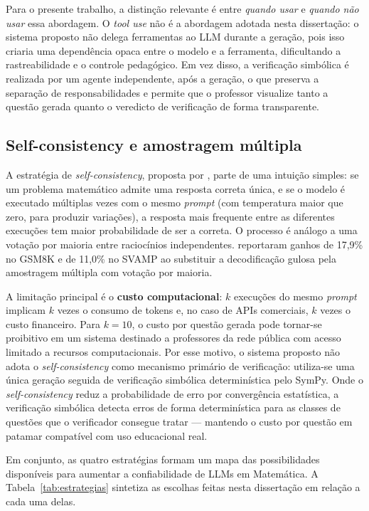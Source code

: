 Para o presente trabalho, a distinção relevante é entre \emph{quando usar} e \emph{quando não usar}
essa abordagem. O \emph{tool use} não é a abordagem adotada nesta dissertação: o sistema proposto não
delega ferramentas ao LLM durante a geração, pois isso criaria uma dependência opaca entre o modelo e
a ferramenta, dificultando a rastreabilidade e o controle pedagógico. Em vez disso, a verificação
simbólica é realizada por um agente independente, após a geração, o que preserva a separação de
responsabilidades e permite que o professor visualize tanto a questão gerada quanto o veredicto de
verificação de forma transparente.

\subsection{Self-consistency e amostragem múltipla}
\label{sub:selfconsistency}

A estratégia de \emph{self-consistency}, proposta por \citet{wang2023selfconsistency}, parte de uma
intuição simples: se um problema matemático admite uma resposta correta única, e se o modelo é
executado múltiplas vezes com o mesmo \emph{prompt} (com temperatura maior que zero, para produzir
variações), a resposta mais frequente entre as diferentes execuções tem maior probabilidade de ser a
correta. O processo é análogo a uma votação por maioria entre raciocínios independentes.
\citet{wang2023selfconsistency} reportaram ganhos de 17,9\% no GSM8K e de 11,0\% no SVAMP ao
substituir a decodificação gulosa pela amostragem múltipla com votação por maioria.

A limitação principal é o \textbf{custo computacional}: $k$ execuções do mesmo \emph{prompt} implicam
$k$ vezes o consumo de tokens e, no caso de APIs comerciais, $k$ vezes o custo financeiro. Para
$k=10$, o custo por questão gerada pode tornar-se proibitivo em um sistema destinado a professores da
rede pública com acesso limitado a recursos computacionais. Por esse motivo, o sistema proposto não
adota o \emph{self-consistency} como mecanismo primário de verificação: utiliza-se uma única geração
seguida de verificação simbólica determinística pelo SymPy. Onde o \emph{self-consistency} reduz a
probabilidade de erro por convergência estatística, a verificação simbólica detecta erros de forma
determinística para as classes de questões que o verificador consegue tratar --- mantendo o custo por
questão em patamar compatível com uso educacional real.

Em conjunto, as quatro estratégias formam um mapa das possibilidades disponíveis para aumentar a
confiabilidade de LLMs em Matemática. A Tabela~\ref{tab:estrategias} sintetiza as escolhas feitas
nesta dissertação em relação a cada uma delas.

